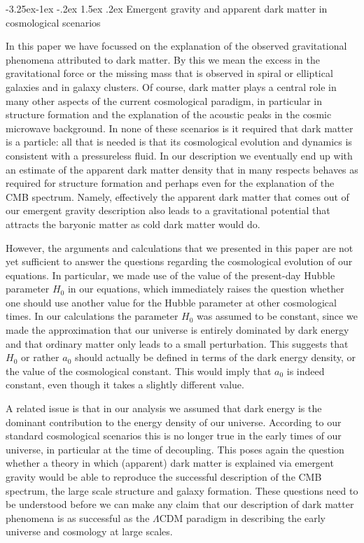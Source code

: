 \documentclass[a4paper,12pt]{article}
\makeatletter
\renewcommand\subsection{\@startsection{subsection}{2}{\z@}%
                                     {-3.25ex\@plus -1ex \@minus -.2ex}%
                                     {1.5ex \@plus .2ex}%
                                     {\normalfont\bfseries}}
\makeatother
\begin{document}
\subsection{Emergent gravity and apparent dark matter in cosmological scenarios}


In this paper we have focussed on the explanation of the observed gravitational phenomena attributed to dark matter. By this we mean the excess in the gravitational force or the missing mass that is observed in spiral or elliptical galaxies and in galaxy clusters. Of course, dark matter plays a central role in many other aspects of the current cosmological paradigm, in particular in structure formation and the explanation of the acoustic peaks in the cosmic microwave background. In none of these scenarios is it required that dark matter is   a particle: all that is needed is that its cosmological evolution and dynamics is consistent with a pressureless fluid. In our description we eventually end up with an estimate of the apparent dark matter density that in many respects behaves as required for structure formation and perhaps even for the explanation of the CMB spectrum. Namely, effectively the apparent dark matter that comes out of our emergent gravity description also leads to a gravitational  potential that attracts the baryonic matter as cold dark matter would do. 

However, the arguments and calculations that we presented in this paper are not yet sufficient  to answer the questions regarding the cosmological evolution of our equations. In particular, we   made use of the value of the present-day Hubble parameter $H_0$ in our equations, which  immediately raises the question whether one should use another value for the Hubble parameter at other cosmological times. In our calculations the parameter $H_0$ was assumed to be constant, since we made the approximation that our universe is entirely dominated by dark energy and that ordinary matter only leads to a small perturbation. This suggests that $H_0$ or rather $a_0$ should actually be defined in terms of the dark energy density, or the value of the cosmological constant.  This would imply that $a_0$ is indeed  constant, even though it takes a slightly different value. 

A related issue is that in our analysis we assumed that dark energy is the dominant contribution to the energy density of our universe. According to our standard cosmological scenarios this is no longer true in the early times of our universe, in particular at the time of decoupling.  This poses again the question whether a theory in which   (apparent) dark matter is explained via emergent gravity would be able to reproduce the successful description of the CMB spectrum, the large scale structure and galaxy formation. These questions need to be understood before we can make any claim that our description of dark matter phenomena is as successful as the $\Lambda$CDM paradigm in describing the early universe and cosmology at large scales.  
\end{document}
